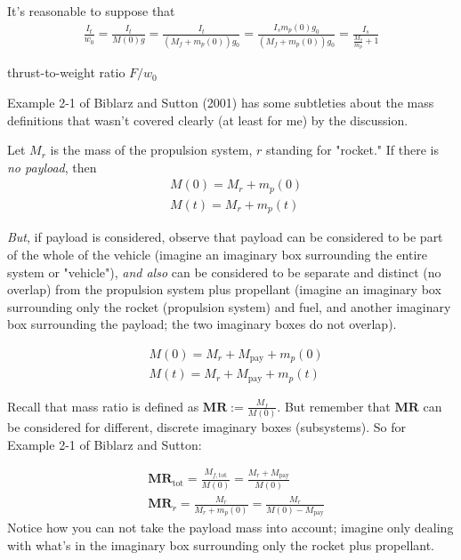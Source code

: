 \documentclass[10pt]{amsart}
\begin{document}
\begin{multicols*}{2}
It's reasonable to suppose that 
\[
\begin{gathered}
\frac{I_t}{w_0} = \frac{I_t}{ M(0) g} = \frac{I_t}{  (M_f + m_p(0)) g_0} = \frac{I_s m_p(0) g_0}{ (M_f + m_p(0)) g_0} = \frac{ I_s}{ \frac{M_s}{m_p} + 1}
\end{gathered}
\]

thrust-to-weight ratio $F/w_0$





Example 2-1 of Biblarz and Sutton (2001) \cite{GSuttonOBiblarz2001} has some subtleties about the mass definitions that wasn't covered clearly (at least for me) by the discussion.

Let $M_r$ is the mass of the propulsion system, $r$ standing for "rocket." If there is \emph{no payload}, then 
\[
\begin{aligned} 
& M(0) = M_r + m_p(0) \\
& M(t) = M_r + m_p(t)
\end{aligned}
\]

\emph{But}, if payload is considered, observe that payload can be considered to be part of the whole of the vehicle (imagine an imaginary box surrounding the entire system or "vehicle"), \emph{and also} can be considered to be separate and distinct (no overlap) from the propulsion system plus propellant (imagine an imaginary box surrounding only the rocket (propulsion system) and fuel, and another imaginary box surrounding the payload; the two imaginary boxes do not overlap).

\[
\begin{aligned}
& M(0) = M_r + M_{\text{pay}} + m_p(0) \\
& M(t) = M_r + M_{\text{pay}} + m_p(t) 
\end{aligned}
\]

Recall that mass ratio is defined as $\mathbf{MR} := \frac{M_f}{ M(0)}$. But remember that $\mathbf{MR}$ can be considered for different, discrete imaginary boxes (subsystems). So for Example 2-1 of Biblarz and Sutton:

\[
\begin{aligned}
&	\mathbf{MR}_{\text{tot}} = \frac{M_{f, \text{tot}}}{M(0)} = \frac{M_r + M_{\text{pay}}}{ M(0) } \\
	& \mathbf{MR}_r = \frac{ M_r }{ M_r+ m_p(0)} = \frac{M_r }{ M(0) - M_{\text{pay}}}
\end{aligned}
\]
Notice how you can not take the payload mass into account; imagine only dealing with what's in the imaginary box surrounding only the rocket plus propellant.


\end{multicols*}
\end{document}
